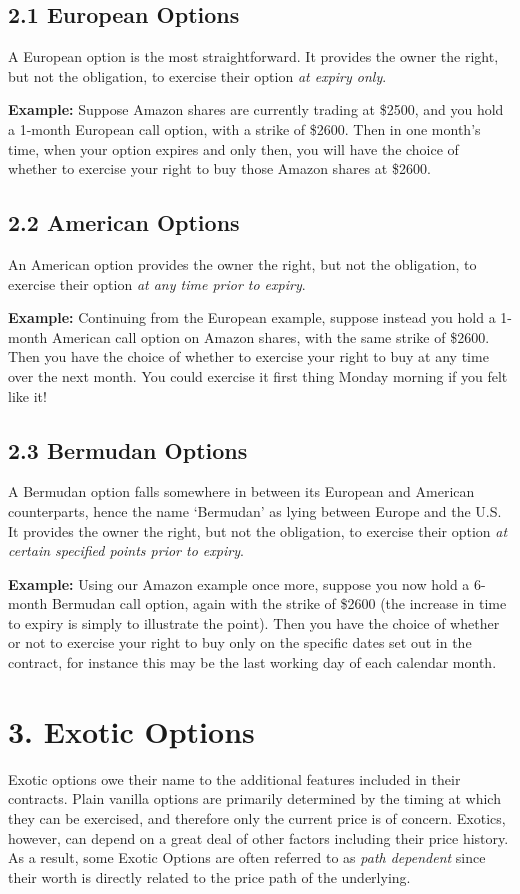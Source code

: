 \documentclass[11pt]{article}
\begin{document}
\subsection*{2.1 European Options}
A European option is the most straightforward. It provides the owner the right, but not the obligation, to exercise their option \textit{at expiry only}.

\textbf{Example:}
Suppose Amazon shares are currently trading at \$2500, and you hold a 1-month European call option, with a strike of \$2600. Then in one month's time, when your option expires and only then, you will have the choice of whether to exercise your right to buy those Amazon shares at \$2600.

\subsection*{2.2 American Options}
An American option provides the owner the right, but not the obligation, to exercise their option \textit{at any time prior to expiry}.

\textbf{Example:} Continuing from the European example, suppose instead you hold a 1-month American call option on Amazon shares, with the same strike of \$2600. Then you have the choice of whether to exercise your right to buy at any time over the next month. You could exercise it first thing Monday morning if you felt like it!

\subsection*{2.3 Bermudan Options}
A Bermudan option falls somewhere in between its European and American counterparts, hence the name `Bermudan' as lying between Europe and the U.S. It provides the owner the right, but not the obligation, to exercise their option \textit{at certain specified points prior to expiry}.

\textbf{Example:} Using our Amazon example once more, suppose you now hold a 6-month Bermudan call option, again with the strike of \$2600 (the increase in time to expiry is simply to illustrate the point). Then you have the choice of whether or not to exercise your right to buy only on the specific dates set out in the contract, for instance this may be the last working day of each calendar month. 

\newpage

\section*{3. Exotic Options}
Exotic options owe their name to the additional features included in their contracts. Plain vanilla options are primarily determined by the timing at which they can be exercised, and therefore only the current price is of concern. Exotics, however, can depend on a great deal of other factors including their price history. As a result, some Exotic Options are often referred to as \textit{path dependent} since their worth is directly related to the price path of the underlying.
\end{document}
